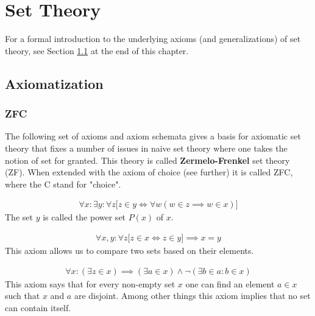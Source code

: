 \chapter{Set Theory}

    For a formal introduction to the underlying axioms (and generalizations) of set theory, see Section \ref{set:section:axiomatization} at the end of this chapter.

\section{Axiomatization}\label{set:section:axiomatization}
\subsection{ZFC}

    The following set of axioms and axiom schemata gives a basis for axiomatic set theory that fixes a number of issues in naive set theory where one takes the notion of set for granted. This theory is called \textbf{Zermelo-Frenkel} set theory (ZF). When extended with the axiom of choice (see further) it is called ZFC, where the C stand for "choice".

    \begin{axiom}\label{set:power_set_axiom}
        \begin{gather}
            \forall x:\exists y:\forall z\big[z\in y\iff\forall w(w\in z\implies w\in x)\big]
        \end{gather}
        The set $y$ is called the power set $P(x)$ of $x$.
    \end{axiom}

    \begin{axiom}[Extensionality]
        \begin{gather}
            \forall x,y:\forall z\big[z\in x\iff z\in y\big]\implies x=y
        \end{gather}
        This axiom allows us to compare two sets based on their elements.
    \end{axiom}

    \begin{axiom}
        \begin{gather}
            \forall x:(\exists z\in x)\implies(\exists a\in x)\land\neg(\exists b\in a:b\in x)
        \end{gather}
        This axiom says that for every non-empty set $x$ one can find an element $a\in x$ such that $x$ and $a$ are disjoint. Among other things this axiom implies that no set can contain itself.
    \end{axiom}

